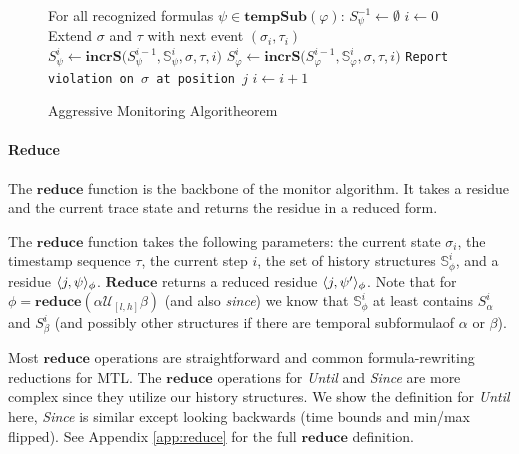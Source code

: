 \begin{figure}
\begin{algorithmic}[1]
\STATE For all recognized formulas $\psi \in \mathbf{tempSub}(\varphi)$: $S^{-1}_{\psi} \leftarrow \emptyset$
\STATE $i \leftarrow 0$
\LOOP
\STATE Extend $\sigma$ and $\tau$ with next event $(\sigma_i,\tau_i)$
	\STATE $S^i_{\psi} \leftarrow \mathbf{incrS(} S^{i-1}_{\psi}, \mathbb{S}^i_{\psi}, \sigma, \tau, i)$
\ENDFOR
\STATE $S^i_{\varphi} \leftarrow \mathbf{incrS(} S^{i-1}_{\varphi}, \mathbb{S}^i_{\varphi}, \sigma, \tau, i)$
\STATE \texttt{Report violation on $\sigma$ at position $j$}
\ENDFOR
\STATE $i \leftarrow i + 1$
\ENDLOOP
\end{algorithmic}
\caption{Aggressive Monitoring Algoritheorem}\label{fig:ag_algorithm}
\end{figure}



\paragraph{Reduce}
The $\mathbf{reduce}$ function is the backbone of the monitor algorithm. It takes a residue and the current trace state and returns the residue in a reduced form.

The $\mathbf{reduce}$ function takes the following parameters: the current state $\sigma_i$, the timestamp sequence $\tau$, the current step $i$, the set of history structures $\mathbb{S}^i_{\phi}$, and a residue $\langle j, \psi \rangle_{\phi}$. $\mathbf{Reduce}$ returns a reduced residue $\langle j, \psi' \rangle_{\phi}$. Note that for $\phi = \mathbf{reduce}(\alpha \mathcal{U}_{[l,h]} \beta)$ (and also \emph{since}) we know that $\mathbb{S}^i_\phi$ at least contains $S^i_\alpha$ and $S^i_\beta$ (and possibly other structures if there are temporal subformulaof $\alpha$ or $\beta$).

Most $\mathbf{reduce}$ operations are straightforward and common formula-rewriting reductions for MTL. The $\mathbf{reduce}$ operations for \emph{Until} and \emph{Since} are more complex since they utilize our history structures. We show the definition for \emph{Until} here, \emph{Since} is similar except looking backwards (time bounds and min/max flipped). See Appendix \ref{app:reduce} for the full $\mathbf{reduce}$ definition.

